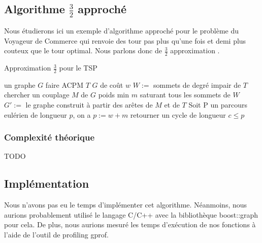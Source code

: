 \subsection{Algorithme $\frac{3}{2}$ approché}

Nous étudierons ici un exemple d'algorithme approché pour le problème du 
Voyageur de Commerce qui renvoie des tour pas plus qu'une fois et demi plus
couteux que le tour optimal. Nous parlons donc de \og $\frac{3}{2}$ approximation \fg{}.

\begin{algorithm}[!ht]
\caption{Approximation $\frac{3}{2}$ pour le TSP}
\label{3-2tsp}
\begin{algorithmic}[1]
\REQUIRE un graphe $G$
\STATE faire ACPM $T$ $G$ de coût $w$
\STATE $W := $ sommets de degré impair de $T$
\STATE chercher un couplage $M$ de $G$ poids min $m$ saturant tous les
sommets de $W$
\STATE $G' := $ le graphe construit à partir des arêtes de $M$ et de
$T$
\STATE Soit P un parcours eulérien de longueur $p$, on a $p:= w + m$
\STATE retourner un cycle de longueur $c \leq p$
\end{algorithmic}
\end{algorithm}

\subsubsection{Complexité théorique}

TODO

\subsection{Implémentation}

Nous n'avons pas eu le temps d'implémenter cet algorithme. Néanmoins,
nous aurions probablement utilisé le langage C/C++ avec la
bibliothèque boost::graph pour cela. De plus, nous aurions mesuré les
temps d'exécution de nos fonctions à l'aide de l'outil de profiling gprof.

